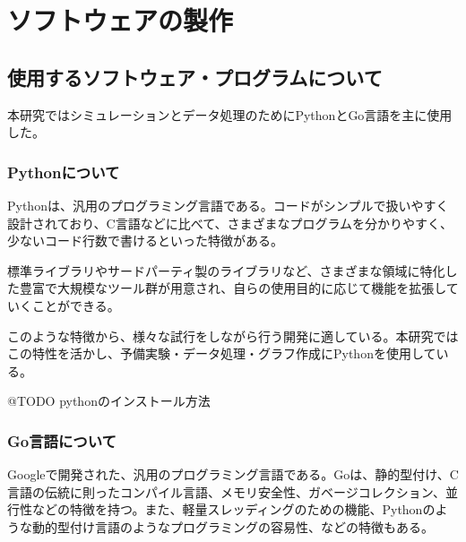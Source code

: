 \hypertarget{ux30bdux30d5ux30c8ux30a6ux30a7ux30a2ux306eux88fdux4f5c}{%
\section{ソフトウェアの製作}\label{ux30bdux30d5ux30c8ux30a6ux30a7ux30a2ux306eux88fdux4f5c}}

\hypertarget{ux4f7fux7528ux3059ux308bux30bdux30d5ux30c8ux30a6ux30a7ux30a2ux30d7ux30edux30b0ux30e9ux30e0ux306bux3064ux3044ux3066}{%
\subsection{使用するソフトウェア・プログラムについて}\label{ux4f7fux7528ux3059ux308bux30bdux30d5ux30c8ux30a6ux30a7ux30a2ux30d7ux30edux30b0ux30e9ux30e0ux306bux3064ux3044ux3066}}

本研究ではシミュレーションとデータ処理のためにPythonとGo言語を主に使用した。

\hypertarget{pythonux306bux3064ux3044ux3066}{%
\subsubsection{Pythonについて}\label{pythonux306bux3064ux3044ux3066}}

Pythonは、汎用のプログラミング言語である。コードがシンプルで扱いやすく設計されており、C言語などに比べて、さまざまなプログラムを分かりやすく、少ないコード行数で書けるといった特徴がある。

標準ライブラリやサードパーティ製のライブラリなど、さまざまな領域に特化した豊富で大規模なツール群が用意され、自らの使用目的に応じて機能を拡張していくことができる。

このような特徴から、様々な試行をしながら行う開発に適している。本研究ではこの特性を活かし、予備実験・データ処理・グラフ作成にPythonを使用している。

@TODO pythonのインストール方法

\hypertarget{goux8a00ux8a9eux306bux3064ux3044ux3066}{%
\subsubsection{Go言語について}\label{goux8a00ux8a9eux306bux3064ux3044ux3066}}

Googleで開発された、汎用のプログラミング言語である。Goは、静的型付け、C言語の伝統に則ったコンパイル言語、メモリ安全性、ガベージコレクション、並行性などの特徴を持つ。また、軽量スレッディングのための機能、Pythonのような動的型付け言語のようなプログラミングの容易性、などの特徴もある。

